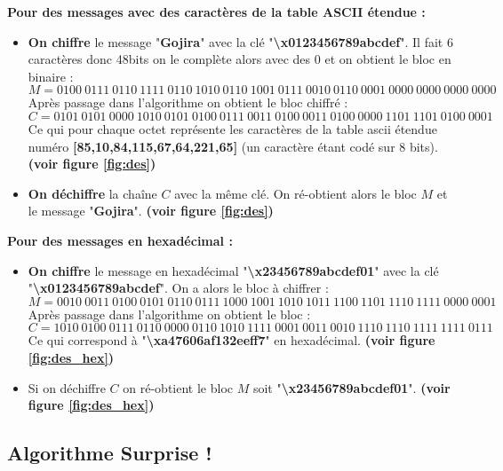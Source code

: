 \documentclass{article}
\begin{document}
\textbf{Pour des messages avec des caractères de la table ASCII étendue : }
\begin{itemize}

\item \textbf{On chiffre} le message "\textbf{Gojira}" avec la clé "\textbf{\textbackslash x0123456789abcdef}". Il fait 6 caractères donc 48bits on le complète alors avec des 0 et on obtient le bloc en binaire : 
\[ M = 0100\ 0111\ 0110\ 1111\ 0110\ 1010\ 0110\ 1001\ 0111\ 0010\ 0110\ 0001\ 0000\ 0000\ 0000\ 0000 \]
Après passage dans l'algorithme on obtient le bloc chiffré : 
\[ C = 0101\ 0101\ 0000\ 1010\ 0101\ 0100\ 0111\ 0011\ 0100\ 0011\ 0100\ 0000\ 1101\ 1101\ 0100\ 0001 \]
Ce qui pour chaque octet représente les caractères de la table ascii étendue numéro \textbf{[85,10,84,115,67,64,221,65]} (un caractère étant codé sur 8 bits). \textbf{(voir figure \ref{fig:des})}
\vspace{1\baselineskip} 

\item \textbf{On déchiffre} la chaîne $C$ avec la même clé. On ré-obtient alors le bloc $M$ et le message "\textbf{Gojira}". \textbf{(voir figure \ref{fig:des})}

\end{itemize}
\textbf{Pour des messages en hexadécimal : }
\begin{itemize}
\item \textbf{On chiffre} le message en hexadécimal "\textbf{\textbackslash x23456789abcdef01}" avec la clé "\textbf{\textbackslash x0123456789abcdef}". On a alors le bloc à chiffrer : 
\[ M = 0010\ 0011\ 0100\ 0101\ 0110\ 0111\ 1000\ 1001\ 1010\ 1011\ 1100\ 1101\ 1110\ 1111\ 0000\ 0001\]
Après passage dans l'algorithme on obtient le bloc : 
\[C = 1010\ 0100\ 0111\ 0110\ 0000\ 0110\ 1010\ 1111\ 0001\ 0011\ 0010\ 1110\ 1110\ 1111\ 1111\ 0111\]
Ce qui correspond à "\textbf{\textbackslash xa47606af132eeff7}" en hexadécimal. \textbf{(voir figure \ref{fig:des_hex})}
\vspace{1\baselineskip} 

\item Si on déchiffre $C$ on ré-obtient le bloc $M$ soit "\textbf{\textbackslash x23456789abcdef01}". \textbf{(voir figure \ref{fig:des_hex})}
\end{itemize}

\subsection{Algorithme Surprise !}
\end{document}

